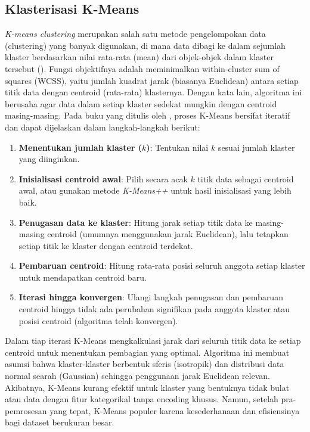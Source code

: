 \subsection{Klasterisasi K-Means}
\textit{K-means clustering} merupakan salah satu metode pengelompokan data (clustering) yang banyak digunakan, di mana data dibagi ke dalam sejumlah klaster berdasarkan nilai rata-rata (mean) dari objek-objek dalam klaster tersebut (\cite{Ikotun2023}). Fungsi objektifnya adalah meminimalkan within-cluster sum of squares (WCSS), yaitu jumlah kuadrat jarak (biasanya Euclidean) antara setiap titik data dengan centroid (rata-rata) klasternya. Dengan kata lain, algoritma ini berusaha agar data dalam setiap klaster sedekat mungkin dengan centroid masing-masing.
Pada buku yang ditulis oleh \textcite{VanderPlas2016}, proses K-Means bersifat iteratif dan dapat dijelaskan dalam langkah-langkah berikut:
\begin{enumerate}
	\item \textbf{Menentukan jumlah klaster ($k$)}: Tentukan nilai $k$ sesuai jumlah klaster yang diinginkan.
	\item \textbf{Inisialisasi centroid awal}: Pilih secara acak $k$ titik data sebagai centroid awal, atau gunakan metode \textit{K-Means++} untuk hasil inisialisasi yang lebih baik.
	\item \textbf{Penugasan data ke klaster}: Hitung jarak setiap titik data ke masing-masing centroid (umumnya menggunakan jarak Euclidean), lalu tetapkan setiap titik ke klaster dengan centroid terdekat.
	\item \textbf{Pembaruan centroid}: Hitung rata-rata posisi seluruh anggota setiap klaster untuk mendapatkan centroid baru.
	\item \textbf{Iterasi hingga konvergen}: Ulangi langkah penugasan dan pembaruan centroid hingga tidak ada perubahan signifikan pada anggota klaster atau posisi centroid (algoritma telah konvergen).
\end{enumerate}
Dalam tiap iterasi K-Means mengkalkulasi jarak dari seluruh titik data ke setiap centroid untuk menentukan pembagian yang optimal. Algoritma ini membuat asumsi bahwa klaster-klaster berbentuk sferis (isotropik) dan distribusi data normal searah (Gaussian) sehingga penggunaan jarak Euclidean relevan. Akibatnya, K-Means kurang efektif untuk klaster yang bentuknya tidak bulat atau data dengan fitur kategorikal tanpa encoding khusus. Namun, setelah pra-pemrosesan yang tepat, K-Means populer karena kesederhanaan dan efisiensinya bagi dataset berukuran besar.

